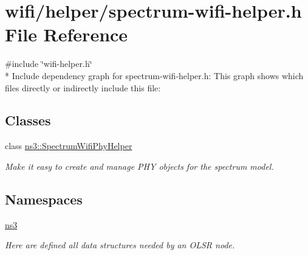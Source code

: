 \hypertarget{spectrum-wifi-helper_8h}{}\section{wifi/helper/spectrum-\/wifi-\/helper.h File Reference}
\label{spectrum-wifi-helper_8h}
{\ttfamily \#include \char`\"{}wifi-\/helper.\+h\char`\"{}}\\*
Include dependency graph for spectrum-\/wifi-\/helper.h\+:
This graph shows which files directly or indirectly include this file\+:
\subsection*{Classes}
\begin{DoxyCompactItemize}
\item 
class \hyperlink{classns3_1_1SpectrumWifiPhyHelper}{ns3\+::\+Spectrum\+Wifi\+Phy\+Helper}
\begin{DoxyCompactList}\small\item\em Make it easy to create and manage P\+HY objects for the spectrum model. \end{DoxyCompactList}\end{DoxyCompactItemize}
\subsection*{Namespaces}
\begin{DoxyCompactItemize}
\item 
 \hyperlink{namespacens3}{ns3}
\begin{DoxyCompactList}\small\item\em Here are defined all data structures needed by an O\+L\+SR node. \end{DoxyCompactList}\end{DoxyCompactItemize}
